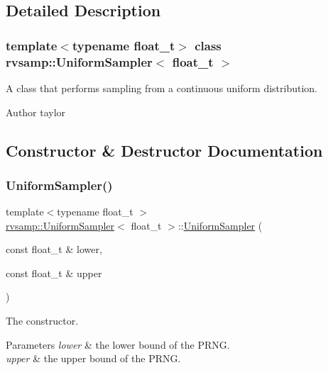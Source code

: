 \subsection{Detailed Description}
\subsubsection*{template$<$typename float\+\_\+t$>$\newline
class rvsamp\+::\+Uniform\+Sampler$<$ float\+\_\+t $>$}

A class that performs sampling from a continuous uniform distribution. 

\begin{DoxyAuthor}{Author}
taylor 
\end{DoxyAuthor}


\subsection{Constructor \& Destructor Documentation}
\mbox{\label{classrvsamp_1_1UniformSampler_a3cea78f63c9f4fc86232043af8ffb442}} 
\subsubsection{\texorpdfstring{Uniform\+Sampler()}{UniformSampler()}}
{\footnotesize\ttfamily template$<$typename float\+\_\+t $>$ \\
\hyperlink{classrvsamp_1_1UniformSampler}{rvsamp\+::\+Uniform\+Sampler}$<$ float\+\_\+t $>$\+::\hyperlink{classrvsamp_1_1UniformSampler}{Uniform\+Sampler} (\begin{DoxyParamCaption}\item[{const float\+\_\+t \&}]{lower,  }\item[{const float\+\_\+t \&}]{upper }\end{DoxyParamCaption})}



The constructor. 


\begin{DoxyParams}{Parameters}
{\em lower} & the lower bound of the P\+R\+NG. \\
\hline
{\em upper} & the upper bound of the P\+R\+NG. \\
\hline
\end{DoxyParams}


